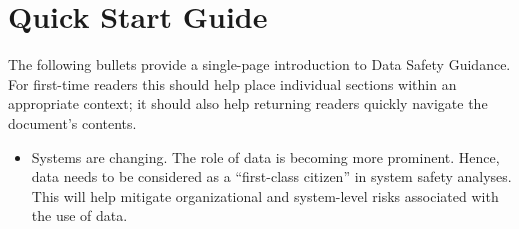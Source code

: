\clearpage
\section*{Quick Start Guide}
\pagestyle{ContinuationPageFrontMatter}


The following bullets provide a single-page introduction to Data Safety Guidance. For first-time readers this should help place individual sections within an appropriate context; it should also help returning readers quickly navigate the document's contents.

\begin{itemize}
  \item Systems are changing. The role of data is becoming more prominent. Hence, data needs to be considered as a ``first-class citizen'' in system safety analyses. This will help mitigate organizational and system-level risks associated with the use of data.


\end{itemize}
